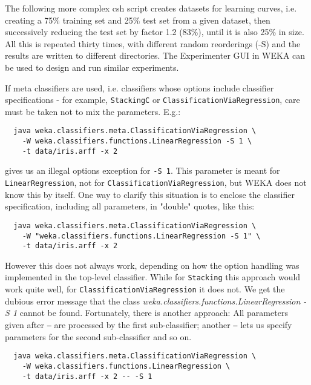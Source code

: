 The following more complex csh script creates datasets for learning curves, i.e. creating a 75\% training set and 25\% test set from a given dataset, then successively reducing the test set by factor 1.2 (83\%), until it is also 25\% in size. All this is repeated thirty times, with different random reorderings (-S) and the results are written to different directories. The Experimenter GUI in WEKA can be used to design and run similar experiments.

{\scriptsize
}

If meta classifiers are used, i.e. classifiers whose options include classifier specifications - for example, \texttt{StackingC} or \texttt{ClassificationViaRegression}, care must be taken not to mix the parameters. E.g.:

{\scriptsize
\begin{verbatim}
  java weka.classifiers.meta.ClassificationViaRegression \
    -W weka.classifiers.functions.LinearRegression -S 1 \
    -t data/iris.arff -x 2
\end{verbatim}}

\noindent gives us an illegal options exception for \texttt{-S 1}. This parameter is meant for \texttt{LinearRegression}, not for \texttt{ClassificationViaRegression}, but WEKA does not know this by itself. One way to clarify this situation is to enclose the classifier specification, including all parameters, in "double" quotes, like this:

{\scriptsize
\begin{verbatim}
  java weka.classifiers.meta.ClassificationViaRegression \
    -W "weka.classifiers.functions.LinearRegression -S 1" \
    -t data/iris.arff -x 2
\end{verbatim}}

\noindent However this does not always work, depending on how the option handling was implemented in the top-level classifier. While for \texttt{Stacking} this approach would work quite well, for \texttt{ClassificationViaRegression} it does not. We get the dubious error message that the class \textit{weka.classifiers.functions.LinearRegression -S 1} cannot be found. Fortunately, there is another approach: All parameters given after \texttt{--} are processed by the first sub-classifier; another \texttt{--} lets us specify parameters for the second sub-classifier and so on.

{\scriptsize
\begin{verbatim}
  java weka.classifiers.meta.ClassificationViaRegression \
    -W weka.classifiers.functions.LinearRegression \
    -t data/iris.arff -x 2 -- -S 1
\end{verbatim}}

